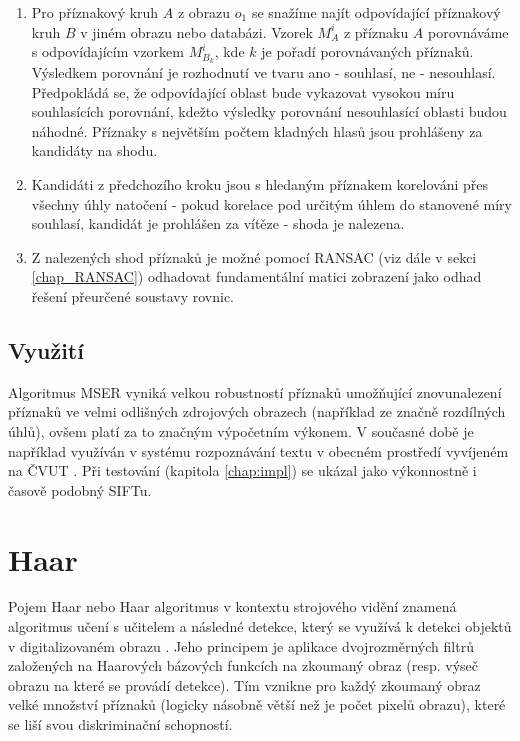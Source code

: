 	\begin{enumerate}
		\item Pro příznakový kruh $A$ z obrazu $o_1$ se snažíme najít odpovídající příznakový kruh $B$ v jiném obrazu nebo databázi. Vzorek $M_{A}^i$ z příznaku $A$ porovnáváme s odpovídajícím vzorkem $M_{B_{k}}^i$, kde $k$ je pořadí porovnávaných příznaků. Výsledkem porovnání je rozhodnutí ve tvaru ano - souhlasí, ne - nesouhlasí. Předpokládá se, že odpovídající oblast bude vykazovat vysokou míru souhlasících porovnání, kdežto výsledky porovnání nesouhlasící oblasti budou náhodné. Příznaky s největším počtem kladných hlasů jsou prohlášeny za kandidáty na shodu.
		
		\item Kandidáti z předchozího kroku jsou s hledaným příznakem korelováni přes všechny úhly natočení - pokud korelace pod určitým úhlem do stanovené míry souhlasí, kandidát je prohlášen za vítěze - shoda je nalezena.
		
		\item Z nalezených shod příznaků je možné pomocí RANSAC (viz dále v sekci \ref{chap_RANSAC}) odhadovat fundamentální matici zobrazení jako odhad řešení přeurčené soustavy rovnic.
	\end{enumerate}
	
	\subsection{Využití}
		Algoritmus MSER vyniká velkou robustností příznaků umožňující znovunalezení příznaků ve velmi odlišných zdrojových obrazech (například ze značně rozdílných úhlů), ovšem platí za to značným výpočetním výkonem. V současné době je například využíván v systému rozpoznávání textu v obecném prostředí vyvíjeném na ČVUT \cite{neumann2012real}. Při testování (kapitola \ref{chap:impl}) se ukázal jako výkonnostně i časově podobný SIFTu.
	

\section{Haar}


	Pojem Haar nebo Haar algoritmus v kontextu strojového vidění znamená algoritmus učení s učitelem a následné detekce, který se využívá k detekci objektů v digitalizovaném obrazu \cite{viola2001rapid} . Jeho principem je aplikace dvojrozměrných filtrů založených na Haarových bázových funkcích na zkoumaný obraz (resp. výseč obrazu na které se provádí detekce). Tím vznikne pro každý zkoumaný obraz velké množství příznaků (logicky násobně větší než je počet pixelů obrazu), které se liší svou diskriminační schopností. 
	
